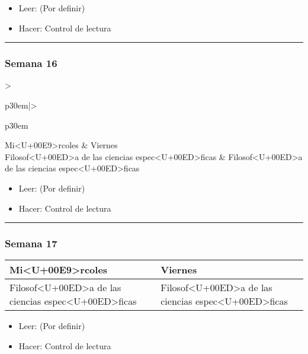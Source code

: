 \documentclass[spanish,]{article}
\begin{document}
\begin{itemize}
\item
  Leer: (Por definir)
\item
  Hacer: Control de lectura
\end{itemize}

\begin{center}\rule{0.5\linewidth}{\linethickness}\end{center}

\subsubsection{Semana 16}\label{semana-16}

\begin{tabular}{>{\raggedright\arraybackslash}p{30em}|>{\raggedright\arraybackslash}p{30em}}
\hline
Mi<U+00E9>rcoles & Viernes\\
\hline
Filosof<U+00ED>a de las ciencias espec<U+00ED>ficas & Filosof<U+00ED>a de las ciencias espec<U+00ED>ficas\\
\hline
\end{tabular}

\begin{itemize}
\item
  Leer: (Por definir)
\item
  Hacer: Control de lectura
\end{itemize}

\begin{center}\rule{0.5\linewidth}{\linethickness}\end{center}

\subsubsection{Semana 17}\label{semana-17}

\begin{tabular}{>{\raggedright\arraybackslash}p{30em}|>{\raggedright\arraybackslash}p{30em}}
\hline
Mi<U+00E9>rcoles & Viernes\\
\hline
Filosof<U+00ED>a de las ciencias espec<U+00ED>ficas & Filosof<U+00ED>a de las ciencias espec<U+00ED>ficas\\
\hline
\end{tabular}

\begin{itemize}
\item
  Leer: (Por definir)
\item
  Hacer: Control de lectura
\end{itemize}
\end{document}
